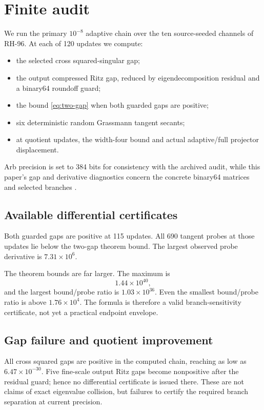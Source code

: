 \documentclass[11pt]{article}
\theoremstyle{definition}
\theoremstyle{remark}
\begin{document}
\section{Finite audit}
\label{sec:audit}

We run the primary $10^{-8}$ adaptive chain over the ten source-seeded
channels of RH-96.  At each of 120 updates we compute:
\begin{itemize}[leftmargin=2em]
\item the selected cross squared-singular gap;
\item the output compressed Ritz gap, reduced by eigendecomposition residual
and a binary64 roundoff guard;
\item the bound \eqref{eq:two-gap} when both guarded gaps are positive;
\item six deterministic random Grassmann tangent secants;
\item at quotient updates, the width-four bound and actual adaptive/full
projector displacement.
\end{itemize}
Arb precision is set to 384 bits for consistency with the archived audit,
while this paper's gap and derivative diagnostics concern the concrete
binary64 matrices and selected branches \citep{Rump2010}.

\subsection{Available differential certificates}

Both guarded gaps are positive at 115 updates.  All 690 tangent probes at
those updates lie below the two-gap theorem bound.  The largest observed probe
derivative is $7.31\times10^6$.

The theorem bounds are far larger.  The maximum is
\[
 1.44\times10^{40},
\]
and the largest bound/probe ratio is $1.03\times10^{36}$.  Even the smallest
bound/probe ratio is above $1.76\times10^4$.  The formula is therefore a valid
branch-sensitivity certificate, not yet a practical endpoint envelope.

\subsection{Gap failure and quotient improvement}

All cross squared gaps are positive in the computed chain, reaching as low as
$6.47\times10^{-30}$.  Five fine-scale output Ritz gaps become nonpositive
after the residual guard; hence no differential certificate is issued there.
These are not claims of exact eigenvalue collision, but failures to certify
the required branch separation at current precision.
\end{document}

